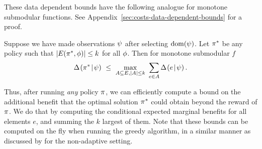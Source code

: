 These data dependent bounds have the following analogue for \term monotone
submodular functions.  See
Appendix~\ref{sec:costs-data-dependent-bounds} for a proof.

%
\begin{lemma} \label{lem:rate-equation}
Suppose we have made observations ${\color{black}{\ensuremath{\psi}}}$ after
selecting $\operatorname{dom}({\color{black}{\ensuremath{\psi}}})$.  Let $\pi^*$ be any policy such that 
$|E({\pi^*}, {{\color{black}{\ensuremath{\phi}}}})| \le k$ for all ${\color{black}{\ensuremath{\phi}}}$.  
Then for \term monotone submodular $f$
\begin{equation}
  \label{eq:data-dependent-bound-adaptive}
\Delta \hspace{-0.3mm} \left( { {\pi^*}\! \mid \! {{\color{black}{\ensuremath{\psi}}}} } \right)   \ \le \ \max_{A \subseteq E, |A| \le
  k} \ \sum_{e \in A} \Delta \hspace{-0.3mm} \left( { {e}\! \mid \! {{\color{black}{\ensuremath{\psi}}}} } \right)  .
\end{equation}
%
\end{lemma}
Thus, after running \emph{any} policy $\pi$, we can efficiently compute a bound on the additional benefit that the optimal solution $\pi^{*}$ could obtain beyond the reward of $\pi$. We do that by computing the conditional expected marginal benefits for all elements $e$, and summing the $k$ largest of them. Note that these bounds can be computed on the fly when running the greedy algorithm, in a similar manner as discussed by \citet{leskovec07} for the non-adaptive setting.


